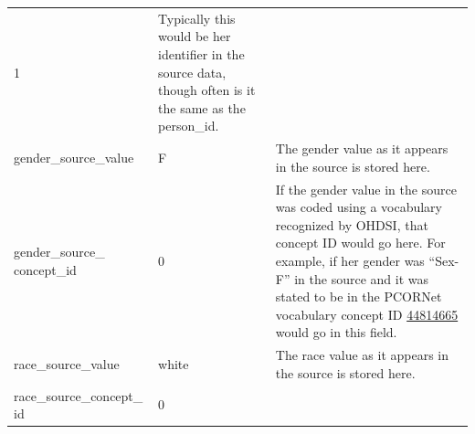 \documentclass[11pt]{book}
\theoremstyle{definition}
\theoremstyle{definition}
\theoremstyle{definition}
\theoremstyle{remark}
\begin{document}
\begin{longtable}[]{@{}lll@{}}
\begin{minipage}[t]{0.15\columnwidth}
1\strut
\end{minipage} & \begin{minipage}[t]{0.49\columnwidth}\raggedright
Typically this would be her identifier in the source data, though often is it the same as the person\_id.\strut
\end{minipage}\tabularnewline
\begin{minipage}[t]{0.28\columnwidth}\raggedright
gender\_source\_value\strut
\end{minipage} & \begin{minipage}[t]{0.15\columnwidth}\raggedright
F\strut
\end{minipage} & \begin{minipage}[t]{0.49\columnwidth}\raggedright
The gender value as it appears in the source is stored here.\strut
\end{minipage}\tabularnewline
\begin{minipage}[t]{0.28\columnwidth}\raggedright
gender\_source\_ concept\_id\strut
\end{minipage} & \begin{minipage}[t]{0.15\columnwidth}\raggedright
0\strut
\end{minipage} & \begin{minipage}[t]{0.49\columnwidth}\raggedright
If the gender value in the source was coded using a vocabulary recognized by OHDSI, that concept ID would go here. For example, if her gender was ``Sex-F'' in the source and it was stated to be in the PCORNet vocabulary concept ID \href{http://athena.ohdsi.org/search-terms/terms/44814665}{44814665} would go in this field.\strut
\end{minipage}\tabularnewline
\begin{minipage}[t]{0.28\columnwidth}\raggedright
race\_source\_value\strut
\end{minipage} & \begin{minipage}[t]{0.15\columnwidth}\raggedright
white\strut
\end{minipage} & \begin{minipage}[t]{0.49\columnwidth}\raggedright
The race value as it appears in the source is stored here.\strut
\end{minipage}\tabularnewline
\begin{minipage}[t]{0.28\columnwidth}\raggedright
race\_source\_concept\_ id\strut
\end{minipage} & \begin{minipage}[t]{0.15\columnwidth}\raggedright
0\strut
\end{minipage} & \begin{minipage}[t]{0.49\columnwidth}\raggedright

\end{minipage}
\end{longtable}
\end{document}
